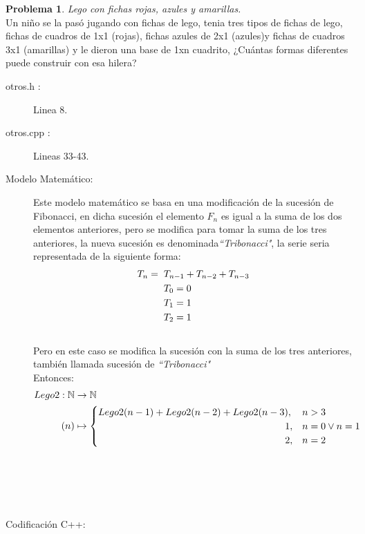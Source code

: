 \documentclass{article}
\theoremstyle{plain}
\theoremstyle{definition}
\newtheorem{problem}{Problema}
\begin{document}
\begin{problem} \emph{Lego con fichas rojas, azules y amarillas.}\\
\hspace*{7mm}Un niño se la pasó jugando con fichas de lego, tenia tres tipos de fichas de lego, fichas de cuadros de 1x1 (rojas), fichas azules de 2x1 (azules)y fichas de cuadros 3x1 (amarillas) y le dieron una base de 1xn cuadrito, ¿Cuántas formas diferentes puede construir con esa hilera?
\begin{description}
\item[otros.h :] Linea 8. \item[otros.cpp :] Lineas 33-43.

\item[Modelo Matemático:]
Este modelo matemático se basa en una modificación de la sucesión de Fibonacci, en dicha sucesión el elemento $F_{n}$ es igual a la suma de los dos elementos anteriores, pero se modifica para tomar la suma de los tres anteriores, la nueva sucesión es denominada\emph{``Tribonacci"}, la serie seria representada de la siguiente forma:\\
\begin{align*}
T_{n} = \hspace*{2mm} &T_{n-1}+T_{n-2}+T_{n-3}\\
&T_{0}=0\\
&T_{1}=1\\
&T_{2}=1
\end{align*}
\\Pero en este caso se modifica la sucesión con la suma de los tres anteriores, también llamada sucesión de \emph{``Tribonacci"}\\
Entonces:
\begin{align*}
Lego2: \mathbb{N} &\to \mathbb{N}\\
(n) &\mapsto
\begin{cases}
Lego2(n-1)+Lego2(n-2)+Lego2(n-3), &n>3\\
\hspace*{68mm}1, &n=0\vee n=1\\
\hspace*{68mm}2, &n=2\\
\end{cases}
\end{align*}
%
\\
\\
\\
\\
\item[Codificación \textsf{C++}:]\hfill
%
\begin{verbatim}

\end{verbatim}
\end{description}
\end{problem}
\end{document}
